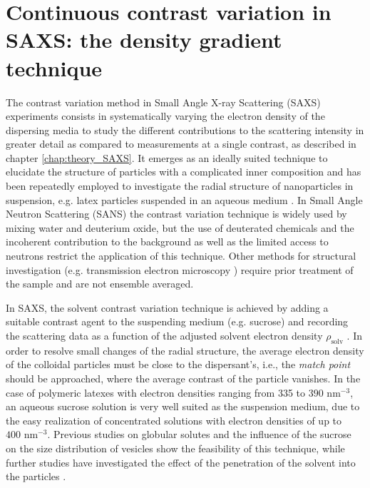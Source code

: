 \chapter{Continuous contrast variation in SAXS: the density gradient technique}
\label{chap:density_gradient_SAXS}
The contrast variation method in Small Angle X-ray Scattering (SAXS) experiments consists in systematically varying the electron density of the dispersing media to study the different contributions to the scattering intensity in greater detail as compared to measurements at a single contrast, as described in chapter \ref{chap:theory_SAXS}. It emerges as an ideally suited technique to elucidate the structure of particles with a complicated inner composition and has been repeatedly employed to investigate the radial structure of nanoparticles in suspension, e.g. latex particles suspended in an aqueous medium \citep{dingenouts_analysis_1999,ballauff_analysis_2011}. In Small Angle Neutron Scattering (SANS) the contrast variation technique is widely used by mixing water and deuterium oxide, but the use of deuterated chemicals and the incoherent contribution to the background as well as the limited access to neutrons restrict the application of this technique. Other methods for structural investigation (e.g. transmission electron microscopy \citep{joensson_morphology_1991,silverstein_microstructure_1989}) require prior treatment of the sample and are not ensemble averaged. 

In SAXS, the solvent contrast variation technique is achieved by adding a suitable contrast agent to the suspending medium (e.g. sucrose) and recording the scattering data as a function of the adjusted solvent electron density \( \rho_{\text{solv}} \) \citep{ballauff_saxs_2001-1,bolze_application_2003}. In order to resolve small changes of the radial structure, the average electron density of the colloidal particles must be close to the dispersant's, i.e., the \emph{match point} should be approached, where the average contrast of the particle vanishes. In the case of polymeric latexes with electron densities ranging from 335 to \(390 \mbox{ nm}^{-3}\), an aqueous sucrose solution is very well suited as the suspension medium, due to the easy realization of concentrated solutions with electron densities of up to \(400 \mbox{ nm}^{-3}\). Previous studies on globular solutes \citep{kawaguchi_isoscattering_1992} and the influence of the sucrose on the size distribution of vesicles \citep{kiselev_sucrose_2001-1} show the feasibility of this technique, while further studies have investigated the effect of the penetration of the solvent into the particles \citep{kawaguchi_isoscattering_1993}.

